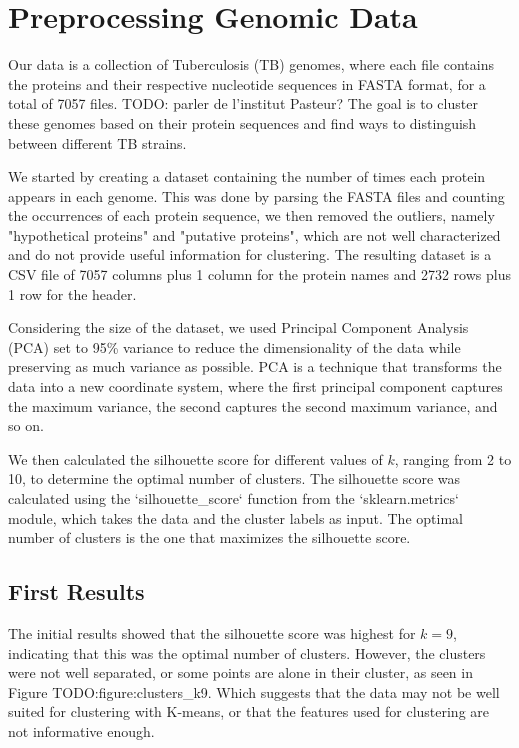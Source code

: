 \section{Preprocessing Genomic Data}
\label{sec:preprocessing_genomic_data}

Our data is a collection of Tuberculosis (TB) genomes, where each file contains the proteins and their respective
nucleotide sequences in FASTA format, for a total of 7057 files.
TODO: parler de l'institut Pasteur?
The goal is to cluster these genomes based on their protein sequences and find ways to distinguish between different
TB strains.

We started by creating a dataset containing the number of times each protein appears in each genome. This was done by
parsing the FASTA files and counting the occurrences of each protein sequence, we then removed the outliers, namely
"hypothetical proteins" and "putative proteins", which are not well characterized and do not provide useful information
for clustering. The resulting dataset is a CSV file of 7057 columns plus 1 column for the protein names and 2732 rows
plus 1 row for the header.

Considering the size of the dataset, we used Principal Component Analysis (PCA) set to 95\% variance to reduce the dimensionality
of the data while preserving as much variance as possible. PCA is a technique that transforms the data into a new coordinate
system, where the first principal component captures the maximum variance, the second captures the second maximum variance,
and so on.

We then calculated the silhouette score for different values of $k$, ranging from 2 to 10, to determine the optimal number
of clusters. The silhouette score was calculated using the `silhouette_score` function from the `sklearn.metrics` module,
which takes the data and the cluster labels as input. The optimal number of clusters is the one that maximizes the silhouette
score.

\subsection{First Results}
\label{subsec:first_results}

The initial results showed that the silhouette score was highest for $k=9$, indicating that this was the optimal number of clusters.
However, the clusters were not well separated, or some points are alone in their cluster, as seen in Figure {TODO:figure:clusters_k9}.
Which suggests that the data may not be well suited for clustering with K-means, or that the features used for clustering are not
informative enough.

